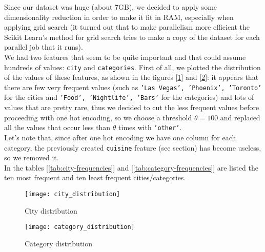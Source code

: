 Since our dataset was huge (about 7GB), we decided to apply some dimensionality reduction in order to make it fit in RAM, especially when applying grid search (it turned out that to make parallelism more efficient the Scikit Learn's method for grid search tries to make a copy of the dataset for each parallel job that it runs).\\
We had two features that seem to be quite important and that could assume hundreds of values: \texttt{city} and \texttt{categories}.
First of all, we plotted the distribution of the values of these features, as shown in the figures [\ref{fig:city-distribution}] and [\ref{fig:category-distribution}]: it appears that there are few very frequent values (such as \texttt{'Las Vegas', 'Phoenix', 'Toronto'} for the cities and \texttt{'Food', 'Nightlife', 'Bars'} for the categories) and lots of values that are pretty rare, thus we decided to cut the less frequent values before proceeding with one hot encoding, so we choose a threshold $\theta=100$ and replaced all the values that occur less than $\theta$ times with \texttt{'other'}.\\
Let's note that, since after one hot encoding we have one column for each category, the previously created \texttt{cuisine} feature (see  section) has become useless, so we removed it.\\
In the tables [\ref{tab:city-frequencies}] and [\ref{tab:category-frequencies}] are listed the ten most frequent and ten least frequent cities/categories.

\begin{figure}[h!]
	\centering
	\texttt{[image: city\_distribution]}
	\caption{City distribution}
	\label{fig:city-distribution}
\end{figure}

\begin{figure}[h!]
	\centering
	\texttt{[image: category\_distribution]}
	\caption{Category distribution}
	\label{fig:category-distribution}
\end{figure}

\newpage

